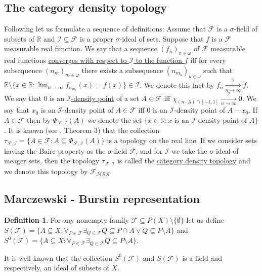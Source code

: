 \documentclass[12pt]{amsart}
\theoremstyle{plain}
\theoremstyle{definition}
\newtheorem{definition}[theorem]{Definition}
\theoremstyle{remark}
\newcommand{\meager}{{\mathcal{MGR}}}
\newcommand{\real}{\mathbb{R}}
\newcommand{\cF}{{\mathcal F}}
\newcommand{\cI}{{\mathcal I}}
\begin{document}
\subsection{The category density topology}
Following \cite{PWBW} let us formulate a sequence
of definitions:
Assume that $\cF$ is a $\sigma$-field of subsets of $\real$
and $\cI \subseteq \cF$ is a proper $\sigma$-ideal of sets.
Suppose that $f$ is a $\cF$ measurable real function.
We say that a sequence $(f_n)_{n\in\omega}$
of $\cF$ measurable real functions \underline{converges
with respect to $\cI$ to the function $f$} iff
for every subsequence $(n_m)_{m\in\omega}$
there exists a subsequence $(n_{m_k})_{k\in\omega}$
such that 
$\real\setminus \lbrace x\in\real\colon \lim_{k\to\infty}
f_{n_{m_k}}(x) = f(x)\rbrace \in \cI$. We denote this fact
by $f_n \xrightarrow[n\to\infty]{\cI} f$.  
We say that $0$ is an \underline{$\cI$-density point}
of a set $A\in\cF$ iff 
$\chi_{(n \cdot A) \cap [-1, 1]} \xrightarrow[n\to\infty]{\cI} 0$. 
We say that $x_0$ is an $\cI$-density point of
$A\in\cF$ iff $0$ is an $\cI$-density point of
$A - x_0$.
If $A \in \cF$ then by $\Phi_{\cF, \cI} (A)$ we denote the set 
$\lbrace x \in \real\colon x \text{ is an } \cI \text{-density point of }A\rbrace$.
It is known (see \cite{PWBW}, Theorem 3) that the collection 
$\tau_{\cF, \cI} = \lbrace A \in \cF\colon A \subseteq \Phi_{\cF, \cI} (A)\rbrace$
is a topology on the real line. 
If we consider sets having the Baire property as the 
$\sigma$-field $\cF$, and for $\cI$ we take
the $\sigma$-ideal of meager sets, then
the topology $\tau_{\cF, \cI}$ is called
the \underline{category density topology}
and we denote this topology by $\cF_{\meager}$.

\subsection{Marczewski - Burstin representation}

\begin{definition}
For any nonempty family $\cF \subseteq P(X) \setminus \{\emptyset\}$
let us define
$S(\cF) = \{A\subseteq X\colon \forall_{P\in\cF} \exists_{Q\in \cF}
Q \subseteq P\cap A \vee Q \subseteq P\setminus A\}$
and 
$S^0(\cF) = \{A\subseteq X\colon \forall_{P\in\cF} \exists_{Q\in \cF}
Q \subseteq P\setminus A\}$. 
\end{definition}
It is well known that the collection $S^0(\cF)$ and $S(\cF)$
is a field and respectively, an ideal of subsets of $X$.
\end{document}
